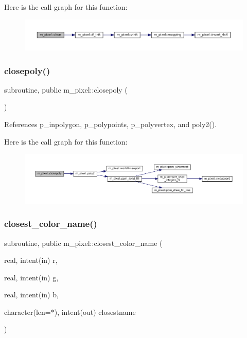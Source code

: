 Here is the call graph for this function\+:
\nopagebreak
\begin{figure}[H]
\begin{center}
\leavevmode
\includegraphics[width=350pt]{namespacem__pixel_af3b81a21a0b2f6b5eddd09c031bd6173_cgraph}
\end{center}
\end{figure}
\mbox{\label{namespacem__pixel_ab3dc83b63d2ab1bf3f63932abca4245d}} 
\subsubsection{\texorpdfstring{closepoly()}{closepoly()}}
{\footnotesize\ttfamily subroutine, public m\+\_\+pixel\+::closepoly (\begin{DoxyParamCaption}{ }\end{DoxyParamCaption})}



References p\+\_\+inpolygon, p\+\_\+polypoints, p\+\_\+polyvertex, and poly2().

Here is the call graph for this function\+:
\nopagebreak
\begin{figure}[H]
\begin{center}
\leavevmode
\includegraphics[width=350pt]{namespacem__pixel_ab3dc83b63d2ab1bf3f63932abca4245d_cgraph}
\end{center}
\end{figure}
\mbox{\label{namespacem__pixel_a8555eecec7e18106e8167e137cfe8424}} 
\subsubsection{\texorpdfstring{closest\+\_\+color\+\_\+name()}{closest\_color\_name()}}
{\footnotesize\ttfamily subroutine, public m\+\_\+pixel\+::closest\+\_\+color\+\_\+name (\begin{DoxyParamCaption}\item[{real, intent(in)}]{r,  }\item[{real, intent(in)}]{g,  }\item[{real, intent(in)}]{b,  }\item[{character(len=$\ast$), intent(out)}]{closestname }\end{DoxyParamCaption})}



